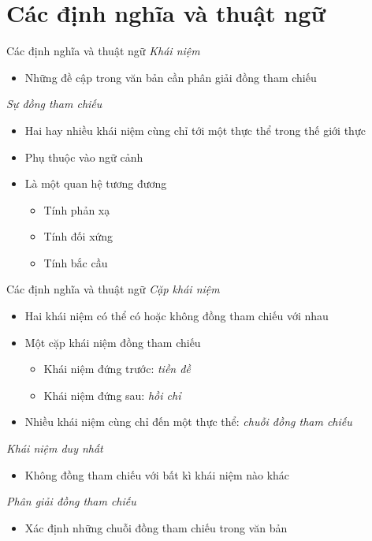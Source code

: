 \section{Các định nghĩa và thuật ngữ}
\begin{frame}{Các định nghĩa và thuật ngữ}
\putlogo
\emph{Khái niệm}
\begin{itemize}
	\item Những đề cập trong văn bản cần phân giải đồng tham chiếu
\end{itemize}
\emph{Sự đồng tham chiếu}
\begin{itemize}
	\item Hai hay nhiều khái niệm cùng chỉ tới một thực thể trong thế giới thực
	\item Phụ thuộc vào ngữ cảnh
	\item Là một quan hệ tương đương
	\begin{itemize}
		\item Tính phản xạ
		\item Tính đối xứng 
		\item Tính bắc cầu
	\end{itemize}
\end{itemize}
\end{frame}

\begin{frame}{Các định nghĩa và thuật ngữ}
\putlogo
\emph{Cặp khái niệm}
\begin{itemize}
	\item Hai khái niệm có thể có hoặc không đồng tham chiếu với nhau
	\item Một cặp khái niệm đồng tham chiếu
	\begin{itemize}
		\item Khái niệm đứng trước: \emph{tiền đề}
		\item Khái niệm đứng sau: \emph{hồi chỉ}
	\end{itemize}
	\item Nhiều khái niệm cùng chỉ đến một thực thể: \emph{chuỗi đồng tham chiếu}
\end{itemize}
\emph{Khái niệm duy nhất}
\begin{itemize}
	\item Không đồng tham chiếu với bất kì khái niệm nào khác
\end{itemize}
\emph{Phân giải đồng tham chiếu}
\begin{itemize}
	\item Xác định những chuỗi đồng tham chiếu trong văn bản
\end{itemize}
\end{frame}

